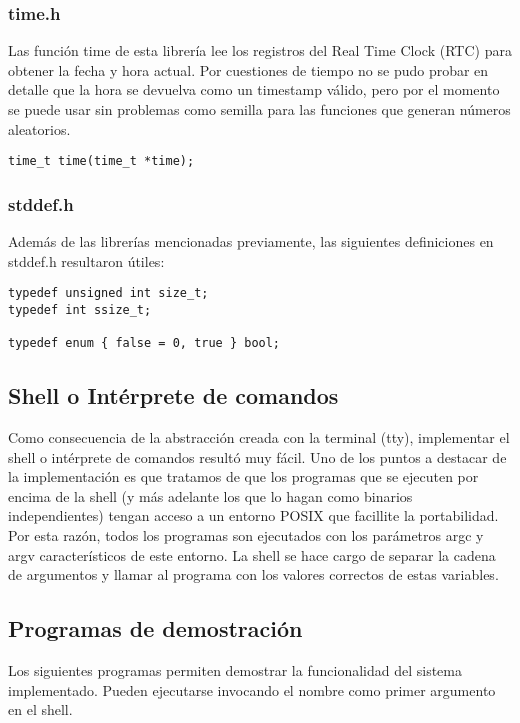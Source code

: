 \documentclass[11pt]{article}
\begin{document}
\subsubsection{time.h}

Las función time de esta librería lee los registros del Real Time Clock (RTC) para obtener la fecha y hora actual. Por cuestiones de tiempo no se pudo probar en detalle que la hora se devuelva como un timestamp válido, pero por el momento se puede usar sin problemas como semilla para las funciones que generan números aleatorios.

\begin{lstlisting}
time_t time(time_t *time);
\end{lstlisting}

\subsubsection{stddef.h}

Además de las librerías mencionadas previamente, las siguientes definiciones en stddef.h resultaron útiles:

\begin{lstlisting}
typedef unsigned int size_t;
typedef int ssize_t;

typedef enum { false = 0, true } bool;
\end{lstlisting}

\subsection{Shell o Intérprete de comandos}

Como consecuencia de la abstracción creada con la terminal (tty), implementar el shell o intérprete de comandos resultó muy fácil. Uno de los puntos a destacar de la implementación es que tratamos de que los programas que se ejecuten por encima de la shell (y más adelante los que lo hagan como binarios independientes) tengan acceso a un entorno POSIX que facillite la portabilidad. Por esta razón, todos los programas son ejecutados con los parámetros argc y argv característicos de este entorno. La shell se hace cargo de separar la cadena de argumentos y llamar al programa con los valores correctos de estas variables.

\subsection{Programas de demostración}

Los siguientes programas permiten demostrar la funcionalidad del sistema implementado. Pueden ejecutarse invocando el nombre como primer argumento en el shell.
\end{document}
